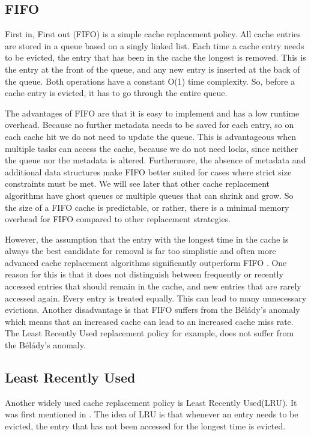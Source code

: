 \documentclass[
	12pt,
	a4paper,
	abstract,
	bibliography=totoc,
	chapterprefix,
	headings=openright,
	numbers=endperiod,
	parskip=half,
	twoside,
]{scrreprt}
\begin{document}
\subsection{FIFO}

First in, First out (FIFO) is a simple cache replacement policy.
All cache entries are stored in a queue based on a singly linked list.
Each time a cache entry needs to be evicted, the entry that has been in the cache the longest is removed.
This is the entry at the front of the queue, and any new entry is inserted at the back of the queue. 
Both operations have a constant O(1) time complexity.
So, before a cache entry is evicted, it has to go through the entire queue.

The advantages of FIFO are that it is easy to implement and has a low runtime overhead.
Because no further metadata needs to be saved for each entry, so on each cache hit we do not need to update the queue.
This is advantageous when multiple tasks can access the cache, 
because we do not need locks, since neither the queue nor the metadata is altered.
Furthermore, the absence of metadata and additional data structures make FIFO better suited for cases where strict size constraints must be met. 
We will see later that other cache replacement algorithms have ghost queues or multiple queues that can shrink and grow. So the size 
of a FIFO cache is predictable, or rather, there is a minimal memory overhead for FIFO compared to other replacement strategies.

However, the assumption that the entry with the longest time in the cache is always the best candidate for removal is far too 
simplistic and often more advanced cache replacement algorithms significantly outperform FIFO \cite{van1992lru}.
One reason for this is that it does not distinguish between frequently or recently accessed entries that should remain in the cache, 
and new entries that are rarely accessed again. Every entry is treated equally. This can lead to many unnecessary evictions.
Another disadvantage is that FIFO suffers from the Bélády's anomaly \cite{10.1145/363011.363155} which means that an increased cache can 
lead to an increased cache miss rate. The Least Recently Used replacement policy for example, does not suffer from the Bélády's anomaly.

\subsection{Least Recently Used}
Another widely used cache replacement policy is Least Recently Used(LRU).
It was first mentioned in \cite{denning1980working}.
The idea of LRU is that whenever an entry needs to be evicted, the entry that has not been accessed for the longest time is evicted.
\end{document}
